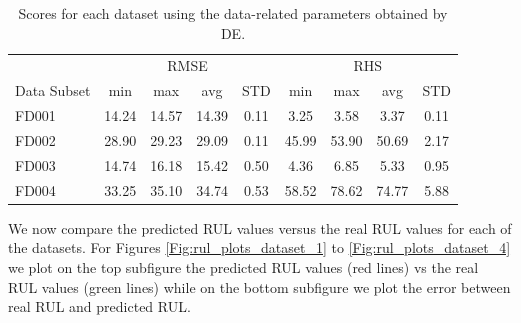 \documentclass[preprint,12pt]{elsarticle}%
\begin{document}
\begin{table}[!htb]
\begin{center}
\begin{tabular}[c]{l|cccc|cccc}\hline
& \multicolumn{4}{|c}{RMSE} & \multicolumn{4}{|c}{RHS}\\
Data Subset & min & max & avg & STD & min & max & avg & STD\\\hline
FD001 & 14.24 & 14.57 & 14.39 & 0.11 & 3.25 & 3.58 & 3.37 & 0.11\\
FD002 & 28.90 & 29.23 & 29.09 & 0.11 & 45.99 & 53.90 & 50.69 & 2.17\\
FD003 & 14.74 & 16.18 & 15.42 & 0.50 & 4.36 & 6.85 & 5.33 & 0.95\\
FD004 & 33.25 & 35.10 & 34.74 & 0.53 & 58.52 & 78.62 & 74.77 & 5.88\\\hline
\end{tabular}
\caption{Scores for each dataset using the data-related parameters obtained by DE.}
\label{table:results_ann_de}
\end{center}
\end{table}

We now compare the predicted RUL values versus the real RUL values for each of the datasets. For Figures \ref{Fig:rul_plots_dataset_1} to \ref{Fig:rul_plots_dataset_4} we plot on the top subfigure the predicted RUL values (red lines) vs the real RUL values (green lines) while on the bottom subfigure we plot the error between real RUL and predicted RUL.

\end{document}
